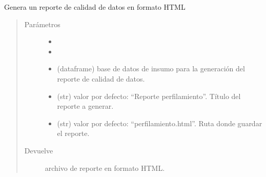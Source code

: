 \documentclass[letterpaper,10pt,openany,spanish]{sphinxmanual}
\begin{document}
\label{\detokenize{reporte:module-reporte}}

\begin{fulllineitems}
\label{\detokenize{reporte:reporte.generar_reporte}}
Genera un reporte de calidad de datos en formato HTML
\begin{quote}\begin{description}
\item[{Parámetros}] \leavevmode\begin{itemize}
\item {} 
 \textendash{} 

\item {} 
 \textendash{} 

\item {} 
 \textendash{} (dataframe) base de datos de insumo para la generación del reporte de calidad de datos.

\item {} 
 \textendash{} (str) valor por defecto: “Reporte perfilamiento”. Título del reporte a generar.

\item {} 
 \textendash{} (str) valor por defecto: “perfilamiento.html”. Ruta donde guardar el reporte.

\end{itemize}

\item[{Devuelve}] \leavevmode
archivo de reporte en formato HTML.

\end{description}\end{quote}

\end{fulllineitems}
\end{document}
